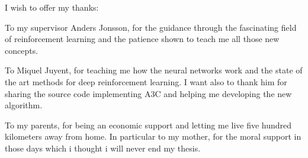 
I wish to offer my thanks:

To my supervisor Anders Jonsson, for the guidance through the fascinating field of reinforcement learning and the
patience shown to teach me all those new concepts.

To Miquel Juyent, for teaching me how the neural networks work and the state of the art methods for deep reinforcement learning.
I want also to thank him for sharing the source code implementing \acl{A3C} and helping me developing the new algorithm.

To my parents, for being an economic support and letting me live five hundred kilometers away from home.
In particular to my mother, for the moral support in those days which i thought i will never end my thesis.